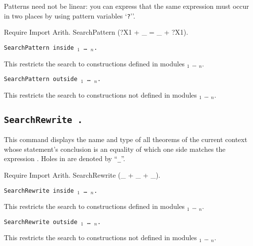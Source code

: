 Patterns need not be linear: you can express that the same expression
must occur in two places by using pattern variables `{\texttt
?{\ident}}''.

\begin{coq_example}
Require Import Arith.
SearchPattern (?X1 + _ = _ + ?X1).
\end{coq_example}

\begin{Variants}
\item {\tt SearchPattern {\term} inside
{\module$_1$} \ldots{} {\module$_n$}.}

This restricts the search to constructions defined in modules
{\module$_1$} \ldots{} {\module$_n$}.

\item {\tt SearchPattern {\term} outside {\module$_1$} \ldots{} {\module$_n$}.}

This restricts the search to constructions not defined in modules
{\module$_1$} \ldots{} {\module$_n$}.

\end{Variants}

\subsection[\tt SearchRewrite {\term}.]{\tt SearchRewrite {\term}.}

This command displays the name and type of all theorems of the current
context whose statement's conclusion is an equality of which one side matches
the expression {\term}. Holes in {\term} are denoted by ``{\texttt \_}''.

\begin{coq_example}
Require Import Arith.
SearchRewrite (_ + _ + _).
\end{coq_example}

\begin{Variants}
\item {\tt SearchRewrite {\term} inside
{\module$_1$} \ldots{} {\module$_n$}.}

This restricts the search to constructions defined in modules
{\module$_1$} \ldots{} {\module$_n$}.

\item {\tt SearchRewrite {\term} outside {\module$_1$} \ldots{} {\module$_n$}.}

This restricts the search to constructions not defined in modules
{\module$_1$} \ldots{} {\module$_n$}.

\end{Variants}



